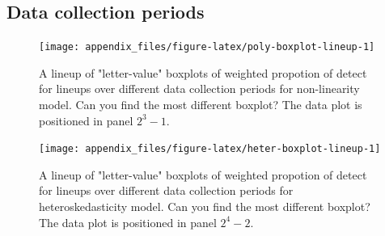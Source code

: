 \documentclass[]{interact}
\theoremstyle{plain}%
\theoremstyle{definition}
\theoremstyle{remark}
\begin{document}
\begin{table}

\caption{\label{tab:experience}Summary of previous experience distribution of subjects recuritted in this study.}
\centering
{}
\end{table}

\hypertarget{data-collection-periods}{%
\subsection{Data collection periods}\label{data-collection-periods}}

\begin{figure}

{\centering \texttt{[image: appendix\_files/figure-latex/poly-boxplot-lineup-1]} 

}

\caption{A lineup of "letter-value" boxplots of weighted propotion of detect for lineups over different data collection periods for non-linearity model. Can you find the most different boxplot? The data plot is positioned in panel $2^3 - 1$.}\label{fig:poly-boxplot-lineup}
\end{figure}

\begin{figure}

{\centering \texttt{[image: appendix\_files/figure-latex/heter-boxplot-lineup-1]} 

}

\caption{A lineup of "letter-value" boxplots of weighted propotion of detect for lineups over different data collection periods for heteroskedasticity model. Can you find the most different boxplot? The data plot is positioned in panel $2^4 - 2$.}\label{fig:heter-boxplot-lineup}
\end{figure}
\end{document}
